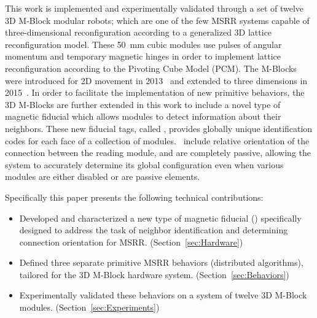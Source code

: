 This work is implemented and experimentally validated through a set of twelve 3D M-Block modular robots; which are one of the few MSRR systems capable of three-dimensional reconfiguration according to a generalized 3D lattice reconfiguration model. These 50~mm cubic modules use pulses of angular momentum and temporary magnetic hinges in order to implement lattice reconfiguration according to the Pivoting Cube Model (PCM). The M-Blocks were introduced for 2D movement in 2013~\cite{RomanishinRus-IROS13} and extended to three dimensions in 2015~\cite{Romanishin20153d}. In order to facilitate the implementation of new primitive behaviors, the 3D M-Blocks are further extended in this work to include a novel type of magnetic fiducial which allows modules to detect information about their neighbors. These new fiducial tags, called \tagNamePlural, provides globally unique identification codes for each face of a collection of modules. \TagNamePlural~include relative orientation of the connection between the reading module, and are completely passive, allowing the system to accurately determine its global configuration even when various modules are either disabled or are passive elements.

Specifically this paper presents the following technical contributions:
\begin{itemize}
	\item Developed and characterized a new type of magnetic fiducial (\TagNamePlural) specifically designed to address the task of neighbor identification and determining connection orientation for MSRR. (Section~\ref{sec:Hardware})
	\item Defined three separate primitive MSRR behaviors (distributed algorithms), tailored for the 3D M-Block hardware system. (Section~\ref{sec:Behaviors})
	\item Experimentally validated these behaviors on a system of twelve 3D M-Block modules. (Section~\ref{sec:Experiments})
\end{itemize}



